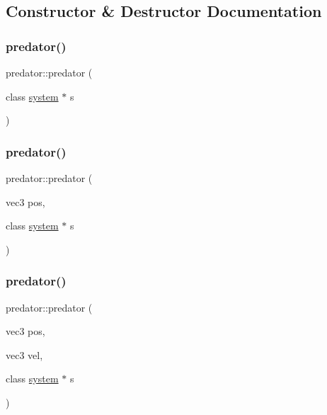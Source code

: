 \subsection{Constructor \& Destructor Documentation}
\mbox{\label{classpredator_ac383b7a31c94d5db16c3d9ac6b21a6b4}} 
\subsubsection{\texorpdfstring{predator()}{predator()}\hspace{0.1cm}{\footnotesize\ttfamily [1/3]}}
{\footnotesize\ttfamily predator\+::predator (\begin{DoxyParamCaption}\item[{class \mbox{\hyperlink{classsystem}{system}} $\ast$}]{s }\end{DoxyParamCaption})}

\mbox{\label{classpredator_ab37695f6e4a34848ef997baf64925fcb}} 
\subsubsection{\texorpdfstring{predator()}{predator()}\hspace{0.1cm}{\footnotesize\ttfamily [2/3]}}
{\footnotesize\ttfamily predator\+::predator (\begin{DoxyParamCaption}\item[{vec3}]{pos,  }\item[{class \mbox{\hyperlink{classsystem}{system}} $\ast$}]{s }\end{DoxyParamCaption})}

\mbox{\label{classpredator_a4626bc2acecb57820cd381a2f4443341}} 
\subsubsection{\texorpdfstring{predator()}{predator()}\hspace{0.1cm}{\footnotesize\ttfamily [3/3]}}
{\footnotesize\ttfamily predator\+::predator (\begin{DoxyParamCaption}\item[{vec3}]{pos,  }\item[{vec3}]{vel,  }\item[{class \mbox{\hyperlink{classsystem}{system}} $\ast$}]{s }\end{DoxyParamCaption})}



